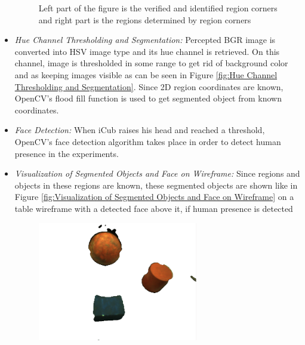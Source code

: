 \documentclass[runningheads,a4paper]{llncs}
\begin{document}
\begin{itemize}
\begin{figure}
{}
\caption{Left part of the figure is the verified and identified region corners and right part is the regions determined by region corners } \label{fig:Verification and Identification of Region Corners and Regions}
\end{figure}
 \item \emph{Hue Channel Thresholding and Segmentation: } Percepted BGR image is converted into HSV image type and its hue channel is retrieved. On this channel, image is thresholded in some range to get rid of background color and as keeping images visible as can be seen in Figure \ref{fig:Hue Channel Thresholding and Segmentation}. Since 2D region coordinates are known, OpenCV's flood fill function is used to get segmented object from known coordinates. 
 \item \emph{Face Detection: }When iCub raises his head and reached a threshold, OpenCV's face detection algorithm takes place in order to detect human presence in the experiments.
 \item \emph{Visualization of Segmented Objects and Face on Wireframe: } Since regions and objects in these regions are known, these segmented objects are shown like in Figure \ref{fig:Visualization of Segmented Objects and Face on Wireframe} on a table wireframe with a detected face above it, if human presence is detected  
\begin{figure}[ht]
\begin{minipage}[b]{0.5\linewidth}
\centering
\includegraphics[width=70mm]{imgs/filteredImage.png}

\end{minipage}
\end{figure}
\end{itemize}
\end{document}
